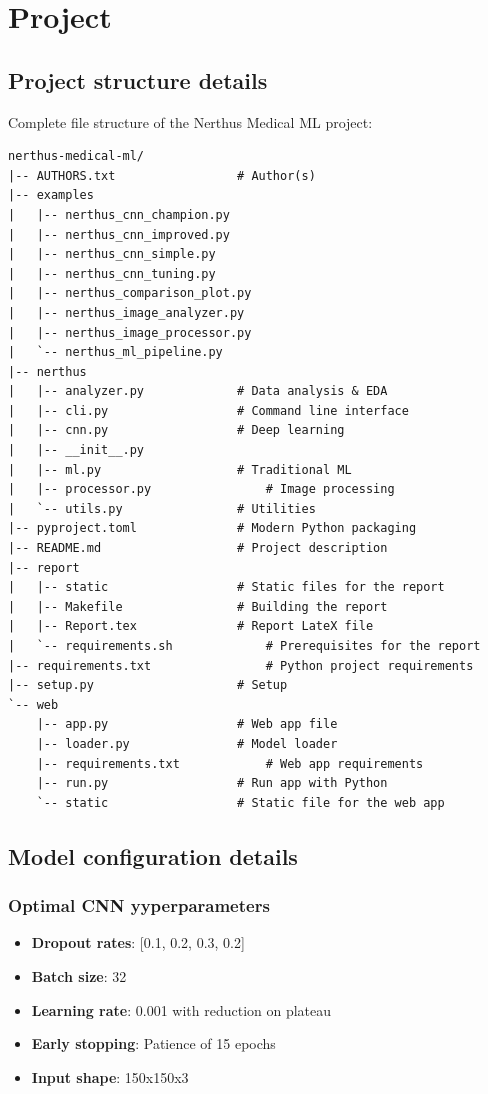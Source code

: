 \documentclass[11pt]{article}
\begin{document}
\section{Project}

\subsection{Project structure details}

Complete file structure of the Nerthus Medical ML project:

\begin{lstlisting}
nerthus-medical-ml/
|-- AUTHORS.txt					# Author(s)
|-- examples
|   |-- nerthus_cnn_champion.py
|   |-- nerthus_cnn_improved.py
|   |-- nerthus_cnn_simple.py
|   |-- nerthus_cnn_tuning.py
|   |-- nerthus_comparison_plot.py
|   |-- nerthus_image_analyzer.py
|   |-- nerthus_image_processor.py
|   `-- nerthus_ml_pipeline.py
|-- nerthus
|   |-- analyzer.py				# Data analysis & EDA
|   |-- cli.py					# Command line interface
|   |-- cnn.py					# Deep learning
|   |-- __init__.py
|   |-- ml.py					# Traditional ML
|   |-- processor.py				# Image processing
|   `-- utils.py				# Utilities
|-- pyproject.toml				# Modern Python packaging
|-- README.md					# Project description
|-- report
|   |-- static					# Static files for the report
|   |-- Makefile				# Building the report
|   |-- Report.tex				# Report LateX file
|   `-- requirements.sh				# Prerequisites for the report
|-- requirements.txt				# Python project requirements
|-- setup.py					# Setup
`-- web
    |-- app.py					# Web app file
    |-- loader.py				# Model loader
    |-- requirements.txt			# Web app requirements
    |-- run.py					# Run app with Python
    `-- static					# Static file for the web app
\end{lstlisting}

\subsection{Model configuration details}

\subsubsection{Optimal CNN yyperparameters}
\begin{itemize}
    \item \textbf{Dropout rates}: [0.1, 0.2, 0.3, 0.2]
    \item \textbf{Batch size}: 32
    \item \textbf{Learning rate}: 0.001 with reduction on plateau
    \item \textbf{Early stopping}: Patience of 15 epochs
    \item \textbf{Input shape}: 150x150x3
\end{itemize}
\end{document}
